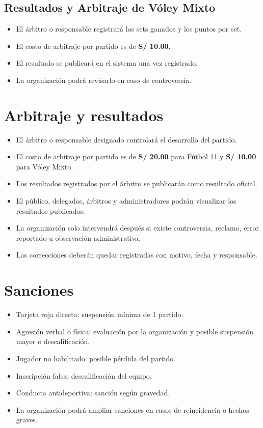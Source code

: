 \documentclass[12pt,a4paper]{article}
\begin{document}
\subsection{Resultados y Arbitraje de Vóley Mixto}

\begin{itemize}
  \item El árbitro o responsable registrará los sets ganados y los puntos por set.
  \item El costo de arbitraje por partido es de \textbf{S/ 10.00}.
  \item El resultado se publicará en el sistema una vez registrado.
  \item La organización podrá revisarlo en caso de controversia.
\end{itemize}

\section{Arbitraje y resultados}

\begin{itemize}
  \item El árbitro o responsable designado controlará el desarrollo del partido.
  \item El costo de arbitraje por partido es de \textbf{S/ 20.00} para Fútbol 11 y \textbf{S/ 10.00} para Vóley Mixto.
  \item Los resultados registrados por el árbitro se publicarán como resultado oficial.
  \item El público, delegados, árbitros y administradores podrán visualizar los resultados publicados.
  \item La organización solo intervendrá después si existe controversia, reclamo, error reportado u observación administrativa.
  \item Las correcciones deberán quedar registradas con motivo, fecha y responsable.
\end{itemize}

\section{Sanciones}

\begin{itemize}
  \item Tarjeta roja directa: suspensión mínima de 1 partido.
  \item Agresión verbal o física: evaluación por la organización y posible suspensión mayor o descalificación.
  \item Jugador no habilitado: posible pérdida del partido.
  \item Inscripción falsa: descalificación del equipo.
  \item Conducta antideportiva: sanción según gravedad.
  \item La organización podrá ampliar sanciones en casos de reincidencia o hechos graves.
\end{itemize}
\end{document}
